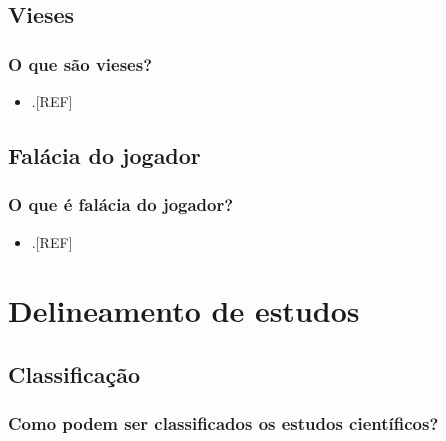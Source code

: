 \documentclass[
]{book}
\providecommand{\tightlist}{%
  \setlength{\itemsep}{0pt}\setlength{\parskip}{0pt}}
\begin{document}
\hypertarget{vieses}{%
\section{Vieses}\label{vieses}}

\hypertarget{o-que-suxe3o-vieses}{%
\subsection{O que são vieses?}\label{o-que-suxe3o-vieses}}

\begin{itemize}
\tightlist
\item
  .{[}REF{]}
\end{itemize}

\hypertarget{jogador}{%
\section{Falácia do jogador}\label{jogador}}

\hypertarget{o-que-uxe9-faluxe1cia-do-jogador}{%
\subsection{O que é falácia do jogador?}\label{o-que-uxe9-faluxe1cia-do-jogador}}

\begin{itemize}
\tightlist
\item
  .{[}REF{]}
\end{itemize}

\hypertarget{delineamento-estudos}{%
\chapter{\texorpdfstring{\textbf{Delineamento de estudos}}{Delineamento de estudos}}\label{delineamento-estudos}}

\hypertarget{classificacao}{%
\section{Classificação}\label{classificacao}}

\hypertarget{como-podem-ser-classificados-os-estudos-cientuxedficos}{%
\subsection{Como podem ser classificados os estudos científicos?}\label{como-podem-ser-classificados-os-estudos-cientuxedficos}}
\end{document}
